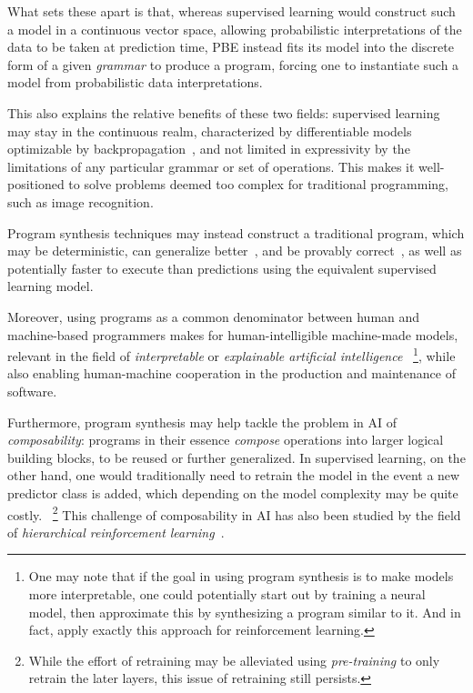 \documentclass{article}
\begin{document}
What sets these apart is that,
whereas supervised learning would construct such a model in a continuous vector space,
allowing probabilistic interpretations of the data to be taken at prediction time,
PBE instead fits its model into the discrete form of a given \emph{grammar} to produce a program,
forcing one to instantiate such a model from probabilistic data interpretations.

This also explains the relative benefits of these two fields:
supervised learning may stay in the continuous realm,
characterized by differentiable models optimizable by backpropagation~\citep{backproprnn},
and not limited in expressivity by the limitations of any particular grammar or set of operations.
This makes it well-positioned to solve problems deemed too complex for traditional programming, such as image recognition.

Program synthesis techniques may instead construct a traditional program,
which may be deterministic, can generalize better~\citep{nps}, and be provably correct~\citep{nps},
as well as potentially faster to execute than predictions using the equivalent supervised learning model.

Moreover, using programs as a common denominator between human and machine-based programmers makes for human-intelligible machine-made models,
relevant in the field of \emph{interpretable} or \emph{explainable artificial intelligence}
~\footnote{
    One may note that if the goal in using program synthesis is to make models more interpretable,
    one could potentially start out by training a neural model,
    then approximate this by synthesizing a program similar to it.
    And in fact, \citet{pirl} apply exactly this approach for reinforcement learning.
},
while also enabling human-machine cooperation in the production and maintenance of software.

Furthermore, program synthesis may help tackle the problem in AI of \emph{composability}:
programs in their essence \emph{compose} operations into larger logical building blocks,
to be reused or further generalized.
In supervised learning, on the other hand,
one would traditionally need to retrain the model in the event a new predictor class is added,
which depending on the model complexity may be quite costly.%
~\footnote{
    While the effort of retraining may be alleviated using \emph{pre-training} to only retrain the later layers,
    this issue of retraining still persists.
}
This challenge of composability in AI has also been studied by the field of \emph{hierarchical reinforcement learning}~\citep{hierarchicalrl}.
\end{document}
